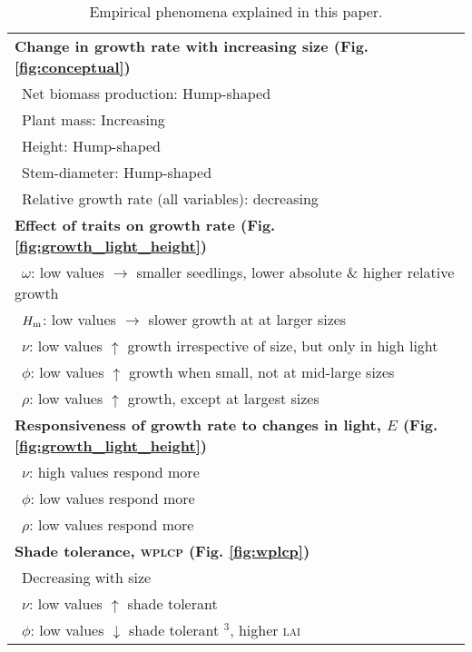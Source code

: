 \documentclass[9pt,twocolumn,twoside]{pnas-new}
\begin{document}
\begin{table}[!ht]
\caption{Empirical phenomena explained in this paper.}
\begin{tabular}{p{8cm}}
\toprule
\textbf{Change in growth rate with increasing size (Fig. \ref{fig:conceptual})}\\
 $\,$ Net biomass production: Hump-shaped \citep{Givnish-1988, Koch-2004} \\
 $\,$ Plant mass: Increasing \citep{Sillett-2010, Stephenson-2014} \\
 $\,$ Height: Hump-shaped \citep{Ryan-2006, Sillett-2010, King-2011} \\
 $\,$ Stem-diameter: Hump-shaped \citep{Canham-2004, Canham-2006, Herault-2011} \\
 $\,$ Relative growth rate (all variables): decreasing \citep{Rees-2010, Iida-2014}\\
\textbf{Effect of traits on growth rate (Fig. \ref{fig:growth_light_height})}\\
 $\,$ $\omega$: low values $\rightarrow$ smaller seedlings, lower absolute \& higher relative growth \citep{Gibert-2016} \\
 $\,$ $H_{\rm m}$: low values $\rightarrow$ slower growth at at larger sizes \citep{Gibert-2016}\\
 $\,$  $\nu$: low values $\uparrow$ growth irrespective of size, but only in high light \citep{Gibert-2016}\\
 $\,$ $\phi$: low values $\uparrow$ growth when small, not at mid-large sizes \citep{Gibert-2016}\\
 $\,$ $\rho$: low values $\uparrow$ growth, except at largest sizes \citep{Gibert-2016}\\
\textbf{Responsiveness of growth rate to changes in light, $E$ (Fig. \ref{fig:growth_light_height})}\\
 $\,$ $\nu$: high values respond more \\
 $\,$ $\phi$: low values respond more \\
 $\,$ $\rho$: low values respond more \citep{Ruger-2012}\\
\textbf{Shade tolerance, \textsc{wplcp} (Fig. \ref{fig:wplcp})}\\
 $\,$ Decreasing with size \citep{Givnish-1988, Kneeshaw-2006, Lusk-2008}\\
 $\,$ $\nu$: low values $\uparrow$ shade tolerant \citep{Messier-1999, Craine-2005,Baltzer-2007}\\
 $\,$ $\phi$: low values $\downarrow$ shade tolerant \citep{Messier-1999, Poorter-2006, Baltzer-2007, Lusk-2008}$^3$, higher \textsc{lai} \citep{Reich-1992, Gower-1993, Niinemets-2010} \\

\end{tabular}
\end{table}
\end{document}
